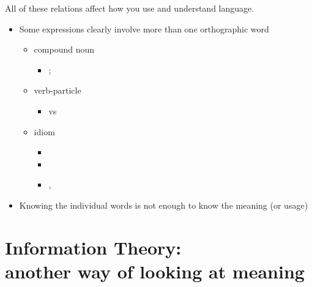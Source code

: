 \documentclass[headrule,footrule]{foils}
\begin{document}
All of these relations affect how you use and understand language.


\begin{itemize}
\item Some expressions clearly involve more than one orthographic word
  \begin{itemize}
  \item compound noun
    \begin{itemize}
    \item {}; 
    \end{itemize}
  \item verb-particle
    \begin{itemize}
    \item {} vs 
    \end{itemize}
  \item  idiom
    \begin{itemize}
    \item {}
    \item {}
    \item {}, 
    \end{itemize}
  \end{itemize}
\item Knowing the individual words is not enough to know the meaning (or usage)
  
\end{itemize}

\section{Information Theory: \\
  another way of looking at meaning}
\end{document}

